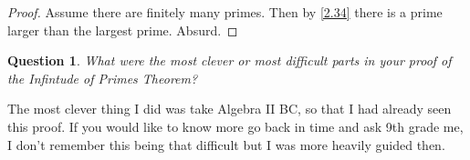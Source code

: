 \documentclass{article}
\newtheorem{ques}[thm]{Question}
\numberwithin{equation}{thm}
\begin{document}
\begin{proof}
  Assume there are finitely many primes. Then by \ref{2.34} there is a prime larger than the largest prime. Absurd.
\end{proof}



\begin{ques} \label{3.36}
  What were the most clever or most difficult parts in your proof of the Infintude of Primes Theorem?
\end{ques}

The most clever thing I did was take Algebra II BC, so that I had already seen this proof. If you would like to know more go back in time and ask 9th grade me, I don't remember this being that difficult but I was more heavily guided then.
\end{document}
